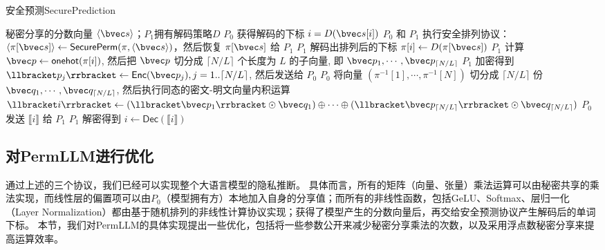 \begin{algorithm}[h]
    \caption{安全预测\textsf{SecurePrediction}}
    \label{alg:perm-llm:prediction}
    \begin{algorithmic}[1]
    \Require 秘密分享的分数向量 $\langle \bvec s \rangle$；$P_1$拥有解码策略$D$
    \Ensure $P_0$ 获得解码的下标 $i = D(\bvec s[i])$
    \State $P_0$ 和 $P_1$ 执行安全排列协议： $\langle \pi[\bvec s] \rangle \gets \mathsf{SecurePerm}(\pi, \langle \bvec s \rangle)$，然后恢复 $\pi[\bvec s]$ 给 $P_1$
    \State $P_1$ 解码出排列后的下标 $\pi[i] \gets D(\pi[\bvec s])$
    \State $P_1$ 计算 $\bvec p \gets \mathsf{onehot}(\pi[i])$, 然后把 $\bvec p$ 切分成 $\lceil N/L \rceil$ 个长度为 $L$ 的子向量, 即 $\bvec p_1, \cdots, \bvec p_{\lceil N/L \rceil}$
    \State $P_1$ 加密得到 $\llbracket p_j \rrbracket \gets \mathsf{Enc}(\bvec p_j), j  = 1..{\lceil N/L \rceil}$, 然后发送给 $P_0$
    \State $P_0$ 将向量 $(\pi^{-1}[1], \cdots, \pi^{-1}[N])$ 切分成 $\lceil N/L \rceil$ 份 $\bvec q_1, \cdots, \bvec q_{\lceil N/L \rceil}$, 然后执行同态的密文-明文向量内积运算 $\llbracket i \rrbracket \gets (\llbracket \bvec p_1 \rrbracket \odot \bvec q_1) \oplus \cdots \oplus (\llbracket \bvec p_{\lceil N/L \rceil} \rrbracket \odot \bvec q_{\lceil N/L \rceil})$
    $P_0$发送 $\llbracket i \rrbracket$ 给 $P_1$
    \State $P_1$ 解密得到 $i \gets \mathsf{Dec}(\llbracket i \rrbracket)$
\end{algorithmic}
\end{algorithm}


\subsection{对PermLLM进行优化}
通过上述的三个协议，我们已经可以实现整个大语言模型的隐私推断。
%
具体而言，所有的矩阵（向量、张量）乘法运算可以由秘密共享的乘法实现，而线性层的偏置项可以由$P_0$（模型拥有方）本地加入自身的分享值；而所有的非线性函数，包括GeLU、Softmax、层归一化（Layer Normalization）都由基于随机排列的非线性计算协议实现；获得了模型产生的分数向量后，再交给安全预测协议产生解码后的单词下标。
%
本节，我们对PermLLM的具体实现提出一些优化，包括将一些参数公开来减少秘密分享乘法的次数，以及采用浮点数秘密分享来提高运算效率。
%
